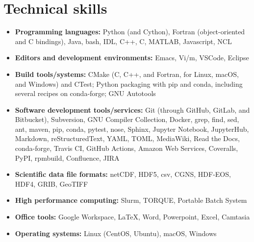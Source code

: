 \section{Technical skills}
\vspace{0.5em}

\begin{itemize}

  \item \textbf{Programming languages:} Python (and Cython),
    Fortran (object-oriented and C bindings), Java, bash,
    IDL, C++, C, MATLAB, Javascript, NCL

  \item \textbf{Editors and development environments:} Emacs, Vi/m, VSCode,
    Eclipse

  \item \textbf{Build tools/systems:} CMake (C, C++, and Fortran, for Linux, macOS,
    and Windows) and CTest; Python packaging with pip and conda, including
    several recipes on conda-forge; GNU Autotools

  \item \textbf{Software development tools/services:} Git (through GitHub,
    GitLab, and Bitbucket), Subversion, GNU Compiler Collection, Docker, grep,
    find, sed, ant, maven, pip, conda, pytest, nose, Sphinx, Jupyter Notebook,
    JupyterHub, Markdown, reStructuredText, YAML, TOML, MediaWiki, Read the
    Docs, conda-forge, {Travis CI}, {GitHub Actions}, {Amazon Web Services},
    Coveralls, PyPI, rpmbuild, Confluence, JIRA

  \item \textbf{Scientific data file formats:} netCDF, HDF5, csv, CGNS, HDF-EOS,
    HDF4, GRIB, GeoTIFF

  \item \textbf{High performance computing:} Slurm, TORQUE, Portable Batch System

  \item \textbf{Office tools:} Google Workspace, \LaTeX, Word, Powerpoint,
   Excel, Camtasia

  \item \textbf{Operating systems:} Linux (CentOS, Ubuntu), macOS, Windows

\end{itemize}
